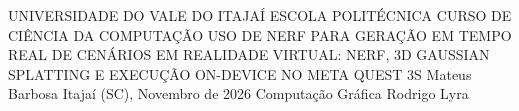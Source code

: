 \begin{Info}
{UNIVERSIDADE DO VALE DO ITAJAÍ}
{ESCOLA POLITÉCNICA}
{CURSO DE CIÊNCIA DA COMPUTAÇÃO}
{USO DE NERF PARA GERAÇÃO EM TEMPO REAL DE CENÁRIOS EM REALIDADE VIRTUAL: NERF, 3D GAUSSIAN SPLATTING E EXECUÇÃO ON-DEVICE NO META QUEST 3S}
{Mateus Barbosa}
{Itajaí (SC), Novembro de 2026}
{Computação Gráfica}
{Rodrigo Lyra}

\end{Info}






